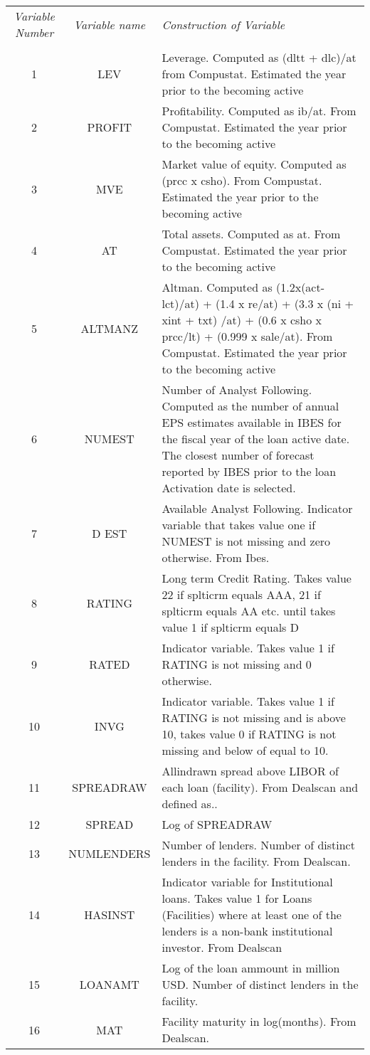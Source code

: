 \begin{tabular}{ccp{10cm}}
\textit{Variable Number} & \textit{Variable name}&\textit{Construction of Variable}\\\\
1&LEV&Leverage. Computed as (dltt + dlc)/at from Compustat. Estimated the year prior to the becoming active\\
2&PROFIT&Profitability. Computed as ib/at. From Compustat. Estimated the year prior to the becoming active\\
3&MVE&Market value of equity. Computed as (prcc x csho). From Compustat. Estimated the year prior to the becoming active\\
4&AT&Total assets. Computed as at. From Compustat. Estimated the year prior to the becoming active\\
5&ALTMANZ&Altman. Computed as (1.2x(act-lct)/at) + (1.4 x re/at) + (3.3 x (ni + xint + txt) /at) + (0.6 x csho x prcc/lt) + (0.999 x sale/at). From Compustat. Estimated the year prior to the becoming active\\
6&NUMEST&Number of Analyst Following. Computed as the number of annual EPS estimates available in IBES for the fiscal year of the loan active date. The closest number of forecast reported by IBES prior to the loan Activation date is selected.\\
7&D EST&Available Analyst Following. Indicator variable that takes value one if NUMEST is not missing and zero otherwise. From Ibes.\\
8&RATING&Long term Credit Rating. Takes value 22 if splticrm equals AAA, 21 if splticrm equals AA etc. until takes value 1 if splticrm equals D\\
9&RATED&Indicator variable. Takes value 1 if RATING is not missing and 0 otherwise.\\
10&INVG&Indicator variable. Takes value 1 if RATING is not missing and is above 10, takes value 0 if RATING is not missing and below of equal to 10.\\
11&SPREADRAW&Allindrawn spread above LIBOR of each loan (facility). From Dealscan and defined as..\\
12&SPREAD&Log of SPREADRAW\\
13&NUMLENDERS&Number of lenders. Number of distinct lenders in the facility. From Dealscan.\\
14&HASINST&Indicator variable for Institutional loans. Takes value 1 for Loans (Facilities) where at least one of the lenders is a non-bank institutional investor. From Dealscan\\
15&LOANAMT&Log of the loan ammount in million USD. Number of distinct lenders in the facility.\\
16&MAT&Facility maturity in log(months). From Dealscan. \\
\end{tabular}

